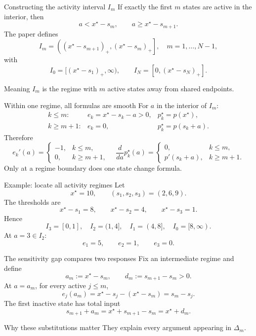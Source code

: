 \documentclass[aspectratio=169,10pt]{beamer}
\newcommand{\pos}[1]{\left(#1\right)_{+}}
\begin{document}
\begin{frame}{Constructing the activity interval \texorpdfstring{$I_m$}{Im}}
If exactly the first $m$ states are active in the interior, then
\[
a<x^\star-s_m,
\qquad
a\ge x^\star-s_{m+1}.
\]
The paper defines
\[
I_m=
\left(
\pos{x^\star-s_{m+1}},
\pos{x^\star-s_m}
\right],
\quad m=1,\ldots,N-1,
\]
with
\[
I_0=[\pos{x^\star-s_1},\infty),
\qquad
I_N=[0,\pos{x^\star-s_N}].
\]
\begin{exampleblock}{Meaning}
$I_m$ is the regime with $m$ active states away from shared endpoints.
\end{exampleblock}
\end{frame}

\begin{frame}{Within one regime, all formulas are smooth}
For $a$ in the interior of $I_m$:
\[
\begin{array}{lll}
k\le m:
&e_k=x^\star-s_k-a>0,
&p_k^\star=p(x^\star),\\[1mm]
k\ge m+1:
&e_k=0,
&p_k^\star=p(s_k+a).
\end{array}
\]
Therefore
\[
e_k'(a)=
\begin{cases}
-1,&k\le m,\\
0,&k\ge m+1,
\end{cases}
\quad
\frac{d}{da}p_k^\star(a)=
\begin{cases}
0,&k\le m,\\
p'(s_k+a),&k\ge m+1.
\end{cases}
\]
Only at a regime boundary does one state change formula.
\end{frame}

\begin{frame}{Example: locate all activity regimes}
Let
\[
x^\star=10,
\qquad
(s_1,s_2,s_3)=(2,6,9).
\]
The thresholds are
\[
x^\star-s_1=8,
\qquad
x^\star-s_2=4,
\qquad
x^\star-s_3=1.
\]
Hence
\[
I_3=[0,1],\quad
I_2=(1,4],\quad
I_1=(4,8],\quad
I_0=[8,\infty).
\]
At $a=3\in I_2$:
\[
e_1=5,\qquad e_2=1,\qquad e_3=0.
\]
\end{frame}

\begin{frame}{The sensitivity gap compares two responses}
Fix an intermediate regime and define
\[
a_m:=x^\star-s_m,
\qquad
d_m:=s_{m+1}-s_m>0.
\]
At $a=a_m$, for every active $j\le m$,
\[
e_j(a_m)
=x^\star-s_j-(x^\star-s_m)
=s_m-s_j.
\]
The first inactive state has total input
\[
s_{m+1}+a_m
=x^\star+s_{m+1}-s_m
=x^\star+d_m.
\]
\begin{block}{Why these substitutions matter}
They explain every argument appearing in $\Delta_m$.
\end{block}
\end{frame}
\end{document}
